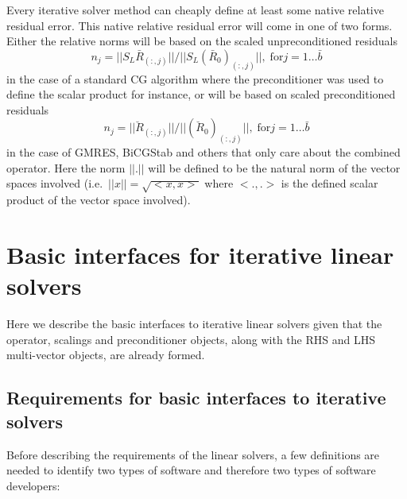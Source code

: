 \documentclass[pdf,ps2pdf,11pt]{SANDreport}
\begin{document}
Every iterative solver method can cheaply define at least some native
relative residual error.  This native relative residual error will
come in one of two forms.  Either the relative norms will be based on
the scaled unpreconditioned residuals
%
\begin{equation}
n_j = ||S_L \bar{R}_{(:,j)}|| / ||S_L (\bar{R}_0)_{(:,j)}||, \; \mbox{for} j = 1 \ldots \bar{b}
\label{belos:eqn:scaled_unprec_rel_norms}
\end{equation}
%
in the case of a standard CG algorithm where the preconditioner was
used to define the scalar product for instance, or will be based on
scaled preconditioned residuals
%
\begin{equation}
n_j = ||\breve{R}_{(:,j)}|| / ||(\breve{R}_0)_{(:,j)}||, \; \mbox{for} j = 1 \ldots \bar{b}
\label{belos:eqn:scaled_prec_rel_norms}
\end{equation}
%
in the case of GMRES, BiCGStab and others that only care about the
combined operator.  Here the norm $||.||$ will be defined to be the
natural norm of the vector spaces involved (i.e.~$||x|| =
{}\sqrt{<x,x>}$ where $<.,.>$ is the defined scalar product of the
vector space involved).

%
\section{Basic interfaces for iterative linear solvers}
%

Here we describe the basic interfaces to iterative linear solvers
given that the operator, scalings and preconditioner objects, along
with the RHS and LHS multi-vector objects, are already formed.

%
\subsection{Requirements for basic interfaces to iterative solvers}
\label{sec:requirements}
%

Before describing the requirements of the linear solvers, a few
definitions are needed to identify two types of software and therefore
two types of software developers:
\end{document}
